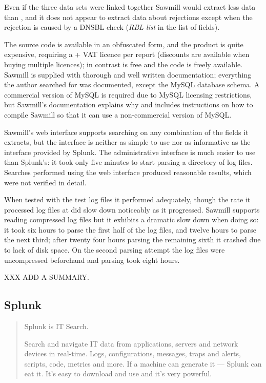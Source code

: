 Even if the three data sets were linked together Sawmill would extract less
data than \parsername{}, and it does not appear to extract data about
rejections except when the rejection is caused by a \gls{DNSBL} check
(\textit{RBL list\/} in the list of fields).

The source code is available in an obfuscated form, and the product is
quite expensive, requiring a  + VAT licence per report
(discounts are available when buying multiple licences); in contrast
\parsername{} is free and the code is freely available.  Sawmill is
supplied with thorough and well written documentation; everything the
author searched for was documented, except the MySQL database schema.  A
commercial version of MySQL is required due to MySQL licensing
restrictions, but Sawmill's documentation explains why and includes
instructions on how to compile Sawmill so that it can use a non-commercial
version of MySQL\@.

Sawmill's web interface supports searching on any combination of the fields
it extracts, but the interface is neither as simple to use nor as
informative as the interface provided by Splunk.  The administrative
interface is much easier to use than Splunk's: it took only five minutes to
start parsing a directory of log files.  Searches performed using the web
interface produced reasonable results, which were not verified in detail.

When tested with the \numberOFlogFILES{} test log files it performed
adequately, though the rate it processed log files at did slow down
noticeably as it progressed.  Sawmill supports reading compressed log files
but it exhibits a dramatic slow down when doing so: it took six hours to
parse the first half of the log files, and twelve hours to parse the next
third; after twenty four hours parsing the remaining sixth it crashed due
to lack of disk space.  On the second parsing attempt the log files were
uncompressed beforehand and parsing took eight hours.

XXX ADD A SUMMARY\@.

\subsection{Splunk}

\begin{quotation}

    Splunk is IT Search.

    Search and navigate IT data from applications, servers and network
    devices in real-time. Logs, configurations, messages, traps and alerts,
    scripts, code, metrics and more. If a machine can generate it ---
    Splunk can eat it. It's easy to download and use and it's very
    powerful.

\end{quotation}

